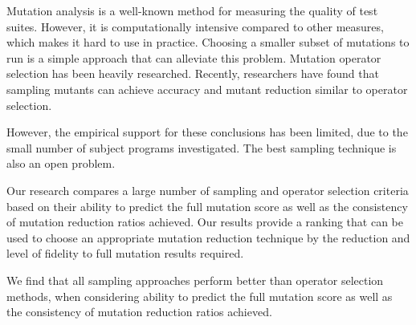 Mutation analysis is a well-known method for measuring the quality of
test suites. However, it is computationally intensive compared to
other measures, which makes it hard to use in practice. Choosing a
smaller subset of mutations to run is a simple approach that can
alleviate this problem.  Mutation operator selection has been heavily
researched. Recently, researchers have found that sampling mutants can
achieve accuracy and mutant reduction similar to operator selection.

However, the empirical support for these conclusions has been limited, due to the small number of subject programs investigated.  The best sampling technique is also an open problem.


Our research compares a large number of sampling and operator
selection criteria based on their ability to predict the full mutation
score as well as the consistency of mutation reduction ratios
achieved. Our results provide a ranking that can be used to choose an
appropriate mutation reduction technique by the reduction and level of fidelity to full mutation results required.



We find that all sampling approaches perform better than operator
selection methods, when considering ability to predict the full
mutation score as well as the consistency of mutation reduction ratios
achieved.



